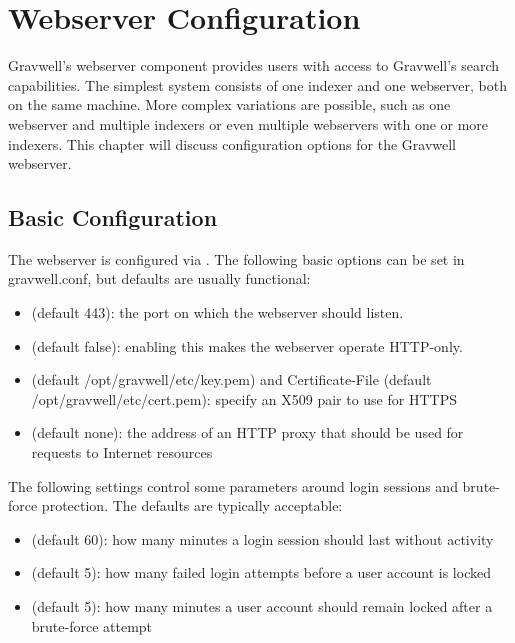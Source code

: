 \chapter{Webserver Configuration}

Gravwell's webserver component provides users with access to Gravwell's
search capabilities. The simplest system consists of one indexer and one
webserver, both on the same machine. More complex variations are
possible, such as one webserver and multiple indexers or even multiple
webservers with one or more indexers. This chapter will discuss
configuration options for the Gravwell webserver.

\section{Basic Configuration}

The webserver is configured via . The following basic options can be set
in gravwell.conf, but defaults are usually functional:

\begin{itemize}
\item
   (default 443): the port on which the webserver should listen.
\item
   (default false): enabling this makes the webserver operate HTTP-only.
\item
   (default /opt/gravwell/etc/key.pem) and Certificate-File
  (default /opt/gravwell/etc/cert.pem): specify an X509 pair to use for
  HTTPS
\item
   (default none): the address of an HTTP proxy that should
  be used for requests to Internet resources
\end{itemize}

The following settings control some parameters around login sessions
and brute-force protection. The defaults are typically acceptable:

\begin{itemize}
\item
   (default 60): how many minutes a login
  session should last without activity
\item
   (default 5): how many failed login attempts
  before a user account is locked
\item
   (default 5): how many minutes a user
  account should remain locked after a brute-force attempt
\end{itemize}

